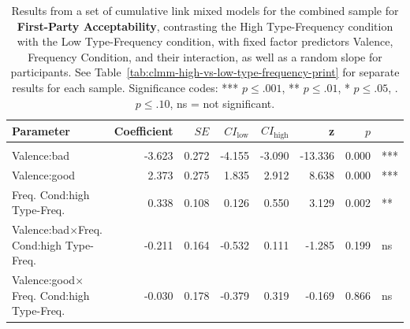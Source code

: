 \documentclass[
]{article}
\begin{document}
\begin{table}
\centering\centering
\caption{\label{tab:clmm-high-vs-low-type-frequency-combined-print-first-party-acceptability}Results from a set of cumulative link mixed models for the combined sample for \textbf{First-Party Acceptability}, contrasting the High Type-Frequency condition with the Low Type-Frequency condition, with fixed factor predictors Valence, Frequency Condition, and their interaction, as well as a random slope for participants. See Table~\ref{tab:clmm-high-vs-low-type-frequency-print} for separate results for each sample. Significance codes: *** $p \leq .001$, ** $p \leq .01$, * $p \leq .05$, . $p \leq .10$, ns = not significant.}
\centering
\begin{tabular}[t]{lrrrrrrl}
\toprule
Parameter & Coefficient & $\mathit{SE}$ & $CI_{\text{low}}$ & $CI_{\text{high}}$ & z & $p$ &  \\
\midrule
\addlinespace[0.3em]
\multicolumn{8}{l}{\textbf{High Type-Frequency vs. Low Type-Frequency}}\\
\hspace{1em}Valence:bad & -3.623 & 0.272 & -4.155 & -3.090 & -13.336 & 0.000 & ***\\
\hspace{1em}Valence:good & 2.373 & 0.275 & 1.835 & 2.912 & 8.638 & 0.000 & ***\\
\hspace{1em}Freq. Cond:high Type-Freq. & 0.338 & 0.108 & 0.126 & 0.550 & 3.129 & 0.002 & **\\
\hspace{1em}Valence:bad$\times$Freq. Cond:high Type-Freq. & -0.211 & 0.164 & -0.532 & 0.111 & -1.285 & 0.199 & ns\\
\hspace{1em}Valence:good$\times$Freq. Cond:high Type-Freq. & -0.030 & 0.178 & -0.379 & 0.319 & -0.169 & 0.866 & ns\\
\bottomrule
\end{tabular}
\end{table}
\end{document}
